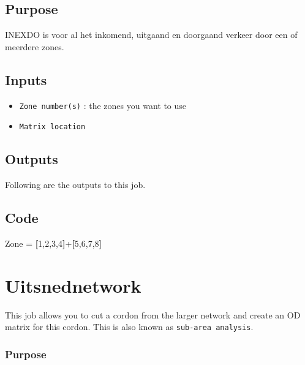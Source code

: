 \documentclass[
  letterpaper,
  DIV=11,
  numbers=noendperiod]{scrreprt}
\newenvironment{Shaded}{\begin{snugshade}}{\end{snugshade}}
\newcommand{\DataTypeTok}[1]{\textcolor[rgb]{0.68,0.00,0.00}{#1}}
\newcommand{\DecValTok}[1]{\textcolor[rgb]{0.68,0.00,0.00}{#1}}
\newcommand{\KeywordTok}[1]{\textcolor[rgb]{0.00,0.23,0.31}{\textbf{#1}}}
\newcommand{\NormalTok}[1]{\textcolor[rgb]{0.00,0.23,0.31}{#1}}
\newcommand{\OperatorTok}[1]{\textcolor[rgb]{0.37,0.37,0.37}{#1}}
\providecommand{\tightlist}{%
  \setlength{\itemsep}{0pt}\setlength{\parskip}{0pt}}
\begin{document}
\section{Purpose}

INEXDO is voor al het inkomend, uitgaand en doorgaand verkeer door een
of meerdere zones.

\section{Inputs}

\begin{itemize}
\tightlist
\item
  \texttt{Zone\ number(s)} : the zones you want to use
\item
  \texttt{Matrix\ location}
\end{itemize}

\section{Outputs}

Following are the outputs to this job.

\section{Code}

\begin{Shaded}
\begin{Highlighting}[]
\DataTypeTok{Zone} \OperatorTok{=} \KeywordTok{[}\DecValTok{1}\NormalTok{,}\DecValTok{2}\NormalTok{,}\DecValTok{3}\NormalTok{,}\DecValTok{4}\KeywordTok{]}\OperatorTok{+}\KeywordTok{[}\DecValTok{5}\NormalTok{,}\DecValTok{6}\NormalTok{,}\DecValTok{7}\NormalTok{,}\DecValTok{8}\KeywordTok{]}

\end{Highlighting}
\end{Shaded}

\chapter{Uitsnednetwork}\label{uitsnednetwork}

This job allows you to cut a cordon from the larger network and create
an OD matrix for this cordon. This is also known as
\texttt{sub-area\ analysis}.

\subsection{Purpose}
\end{document}

